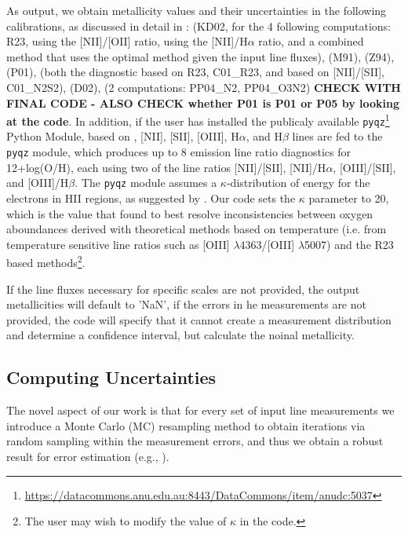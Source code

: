 \documentclass{emulateapj}
\begin{document}
As output, we obtain metallicity values and their uncertainties in the following calibrations, as discussed in detail in \citet{kewley02,kewley08}: \citet{kewley02}(KD02, for the 4 following computations: R23, using the [NII]/[OII] ratio, using the [NII]/H$\alpha$ ratio, and a combined method that uses the optimal method given the input line fluxes), 
\citet{mcgaugh91} (M91), 
\citet{zaritsky94} (Z94), 
\citet{pilyugin01} (P01), 
\citet{Charlot01} (both the diagnostic based on R23, C01\_R23, and based on [NII]/[SII], C01\_N2S2), %
\citet{denicolo02} (D02), 
\citet{pettini04} (2 computations: PP04\_N2, PP04\_O3N2) \textbf{CHECK WITH FINAL CODE - ALSO CHECK whether P01 is P01 or P05 by looking at the code}. 
In addition, if the user has installed the publicaly available \verb=pyqz=\footnote{\url{https://datacommons.anu.edu.au:8443/DataCommons/item/anudc:5037}} Python Module, based on \citet{Dopita13}, [NII], [SII], [OIII], H$\alpha$, and H$\beta$ lines are fed to the \verb=pyqz= module, which produces up to 8 emission line ratio diagnostics for  12+log(O/H), each using two of the line ratios [NII]/[SII], [NII]/H$\alpha$, [OIII]/[SII], and [OIII]/H$\beta$. The \verb=pyqz= module assumes a $\kappa$-distribution of energy for the electrons in HII regions, as suggested by \citet{Nicholls12}. Our code sets the $\kappa$ parameter to 20, which is the value that \citet{Dopita13} found to best resolve inconsistencies between oxygen aboundances derived with theoretical methods based on temperature (i.e. from temperature
sensitive line ratios such as [OIII] $\lambda$4363/[OIII] $\lambda$5007) and the R23 based methods\footnote{The user may wish to modify the value of $\kappa$ in the code.}. 

If the line fluxes necessary for specific scales are not provided, the output  metallicities will default to 'NaN', if the errors in he measurements are not provided, the code will specify that it cannot create a measurement distribution and determine a confidence interval, but calculate the noinal metallicity.



\subsection{Computing Uncertainties}
The novel aspect of our work is that for every set of input line measurements we introduce a Monte Carlo (MC) resampling method to obtain iterations via random sampling within the measurement errors, and thus we obtain a robust result for error estimation (e.g., \citealt{efron79,hastie09,andrae10}). 
\end{document}
